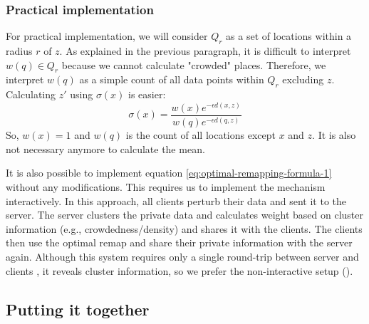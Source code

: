 \subsubsection{Practical implementation}
For practical implementation, we will consider $Q_r$ as a set of locations within a radius $r$ of $z$.
As explained in the previous paragraph, it is difficult to interpret $w(q) \in Q_r$ because we cannot calculate "crowded" places.
Therefore, we interpret $w(q)$ as a simple count of all data points within $Q_r$ excluding $z$. Calculating $z'$ using $\sigma(x)$ is easier:
\begin{equation}
  \sigma(x) = \frac{w(x)e^{-\epsilon d(x, z)}}{w(q)e^{-\epsilon d(q, z)}}
  \label{eq:optimal-remapping-formula-2}
\end{equation}
So, $w(x) = 1$ and $w(q)$ is the count of all locations except $x$ and $z$. It is also not necessary anymore to calculate the mean.

It is also possible to implement equation \ref{eq:optimal-remapping-formula-1} without any modifications.
This requires us to implement the mechanism interactively.
In this approach, all clients perturb their data and sent it to the server.
The server clusters the private data and calculates weight based on cluster information (e.g., crowdedness/density) and shares it with the clients.
The clients then use the optimal remap and share their private information with the server again.
Although this system requires only a single round-trip between server and clients , it reveals cluster information, so we prefer the non-interactive setup ().



\subsection{Putting it together}

\newpage


